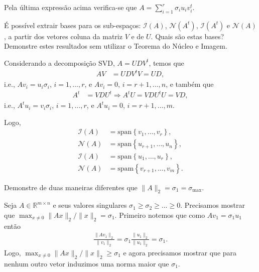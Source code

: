 \documentclass[a4paper,12pt, leqno, answers]{exam}
\begin{document}
\begin{questions}
\begin{solution}
        Pela \'{u}ltima express\~{a}o acima verifica-se que $A = \sum_{i = 1}^r \sigma_i u_i v_i^t$.
    \end{solution}

     \'{E} poss\'{i}vel extrair bases para os sub-espa\c{c}os: $\mathcal{I}(A)$, $\mathcal{N}(A^t)$, $\mathcal{I}(A^t)$ e $\mathcal{N}(A)$, a partir dos vetores coluna da matriz $V$ e de $U$. Quais s\~{a}o estas bases? Demonstre estes resultados sem utilizar o Teorema do N\'{u}cleo e Imagem.
    \begin{solution}
        Considerando a decomposi\c{c}\~{a}o SVD, $A = U D V^t$, temos que
        \begin{align*}
            A V &= U D V^t V = U D,
        \end{align*}
        i.e., $A v_i = u_i \sigma_i$, $i = 1, \ldots, r$, e $A v_i = 0$, $i = r + 1, \ldots, n$, e tamb\'{e}m que
        \begin{align*}
            A^t &= V D U^t \Rightarrow A^t U = V D U^t U = V D,
        \end{align*}
        i.e., $A^t u_i = v_i \sigma_i$, $i = 1, \ldots, r$, e $A^t u_i = 0$, $i = r + 1, \ldots, m$.

        Logo,
        \begin{align*}
            \mathcal{I}(A) &= \mathrm{span}\left\{ v_1, \ldots, v_r \right\}, \\
            \mathcal{N}(A) &= \mathrm{span}\left\{ u_{r+1}, \ldots, u_n \right\}, \\
            \mathcal{I}(A) &= \mathrm{span}\left\{ u_1, \ldots, u_r \right\}, \\
            \mathcal{N}(A) &= \mathrm{spam}\left\{ v_{r+1}, \ldots, v_m \right\}.
        \end{align*}
    \end{solution}

     Demonstre de duas maneiras diferentes que $\| A \|_2 = \sigma_1 = \sigma_{\max}$.
    \begin{solution}
        Seja $A \in \mathbb{R}^{m \times n}$ e seus valores singulares $\sigma_1 \geq \sigma_2 \geq \ldots \geq 0$. Precisamos mostrar que $\max_{x \neq 0} \| A x \|_2 / \| x \|_2 = \sigma_1$. Primeiro notemos que como $A v_1 = \sigma_1 u_1$ ent\~{a}o
        \begin{align*}
            \frac{\| A v_1 \|_2}{\| v_1 \|_2} = \sigma_1 \frac{\| u_1 \|_2}{\| u_1 \|_2} = \sigma_1.
        \end{align*}
        Logo, $\max_{x \neq 0} \| A x \|_2 / \| x \|_2 \geq \sigma_1$ e agora precisamos mostrar que para nenhum outro vetor induzimos uma norma maior que $\sigma_1$.


\end{solution}
\end{questions}
\end{document}
